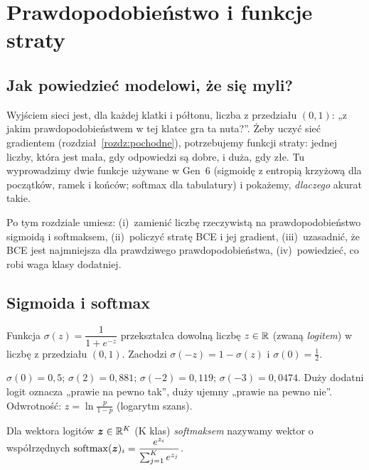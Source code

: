 \chapter{Prawdopodobieństwo i funkcje straty}\label{rozdz:strata}

\section{Jak powiedzieć modelowi, że się myli?}

Wyjściem sieci jest, dla każdej klatki i półtonu, liczba z przedziału $(0,1)$: „z jakim prawdopodobieństwem w tej klatce gra ta nuta?”.
Żeby uczyć sieć gradientem (rozdział~\ref{rozdz:pochodne}), potrzebujemy funkcji straty: jednej liczby, która jest mała, gdy odpowiedzi
są dobre, i duża, gdy złe. Tu wyprowadzimy dwie funkcje używane w Gen~6 (sigmoidę z entropią krzyżową dla początków, ramek i końców; softmax dla tabulatury)
i pokażemy, \emph{dlaczego} akurat takie.

Po tym rozdziale umiesz: (i)~zamienić liczbę rzeczywistą na prawdopodobieństwo sigmoidą i softmaksem, (ii)~policzyć stratę BCE i jej gradient,
(iii)~uzasadnić, że BCE jest najmniejsza dla prawdziwego prawdopodobieństwa, (iv)~powiedzieć, co robi waga klasy dodatniej.

\section{Sigmoida i softmax}

\begin{definicja}[Sigmoida]\label{def:sigmoida}
Funkcja $\sigma(z)=\dfrac1{1+e^{-z}}$ przekształca dowolną liczbę $z\in\mathbb{R}$ (zwaną \emph{logitem}) w liczbę z przedziału $(0,1)$.
Zachodzi $\sigma(-z)=1-\sigma(z)$ i $\sigma(0)=\tfrac12$.
\end{definicja}

\begin{przyklad}\label{prz:sigmoida}
$\sigma(0)=0{,}5$; $\sigma(2)=0{,}881$; $\sigma(-2)=0{,}119$; $\sigma(-3)=0{,}0474$. Duży dodatni logit oznacza „prawie na pewno tak”, duży ujemny
„prawie na pewno nie”. Odwrotność: $z=\ln\frac{p}{1-p}$ (logarytm szans).
\end{przyklad}

\begin{definicja}[Softmax]\label{def:softmax}
Dla wektora logitów $\bm{z}\in\mathbb{R}^K$ (K klas) \emph{softmaksem} nazywamy wektor o współrzędnych
$\operatorname{softmax}(\bm{z})_i=\dfrac{e^{z_i}}{\sum_{j=1}^{K}e^{z_j}}$.
\end{definicja}

